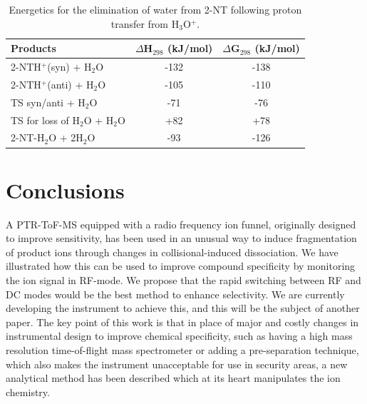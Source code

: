 \begin{table}%
\caption{Energetics for the elimination of water from 2-NT following proton transfer from H$_3$O$^+$.}
\label{table:RF:tab4}
\begin{tabular}{lcc}
\hline
\textbf{Products} & \textbf{$\Delta$H$_{298}$ (kJ/mol)} & \textbf{$\Delta$G$_{298}$ (kJ/mol)} \\
\hline
2-NTH$^+$(syn) + H$_2$O         & -132  & -138   \\
2-NTH$^+$(anti) + H$_2$O        & -105  & -110  \\
TS syn/anti + H$_2$O            & -71  & -76  \\
TS for loss of H$_2$O + H$_2$O  & +82 & +78  \\
2-NT-H$_2$O  + 2H$_2$O          & -93 & -126 \\
\hline
\end{tabular}
\end{table}





\section{Conclusions}
A PTR-ToF-MS equipped with a radio frequency ion funnel, originally designed to improve sensitivity, has been used in an unusual way to induce fragmentation of product ions through changes in collisional-induced dissociation. We have illustrated how this can be used to improve compound specificity by monitoring the ion signal in RF-mode. We propose that the rapid switching between RF and DC modes would be the best method to enhance selectivity. We are currently developing the instrument to achieve this, and this will be the subject of another paper. The key point of this work is that in place of major and costly changes in instrumental design to improve chemical specificity, such as having a high mass resolution time-of-flight mass spectrometer or adding a pre-separation technique, which also makes the instrument unacceptable for use in security areas, a new analytical method has been described which at its heart manipulates the ion chemistry.





